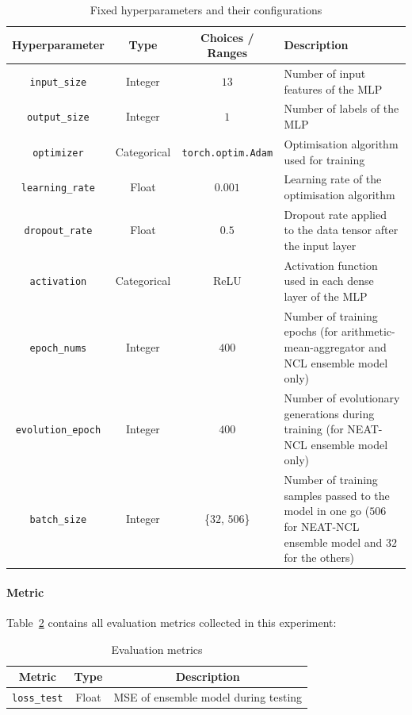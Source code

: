 \documentclass{article}
\begin{document}
\begin{table}[H]
    \centering
    \begin{tabular}{|c|c|c|p{5cm}|}
        \hline
        Hyperparameter & Type & Choices / Ranges & Description \\
        \hline
        \small\texttt{input\_size} & Integer & $13$ & Number of input features of the MLP \\
        \hline
        \small\texttt{output\_size} & Integer & $1$ & Number of labels of the MLP \\
        \hline
        \small\texttt{optimizer} & Categorical & \texttt{torch.optim.Adam} & Optimisation algorithm used for training \\
        \hline
        \small\texttt{learning\_rate} & Float & $0.001$ & Learning rate of the optimisation algorithm \\
        \hline
        \small\texttt{dropout\_rate} & Float & $0.5$ & Dropout rate applied to the data tensor after the input layer \\
        \hline
        \small\texttt{activation} & Categorical & ReLU & Activation function used in each dense layer of the MLP \\
        \hline
        \small\texttt{epoch\_nums} & Integer & $400$ & Number of training epochs (for arithmetic-mean-aggregator and NCL ensemble model only) \\
        \hline
        \small\texttt{evolution\_epoch} & Integer & $400$ & Number of evolutionary generations during training (for NEAT-NCL ensemble model only) \\
        \hline
        \small\texttt{batch\_size} & Integer & \{$32$, $506$\} & Number of training samples passed to the model in one go ($506$ for NEAT-NCL ensemble model and $32$ for the others) \\
        \hline
    \end{tabular}
    \caption{Fixed hyperparameters and their configurations}
    \label{table:experiment_5_fixed_hyperparameters}
\end{table}

\paragraph{Metric}
Table~\ref{table:experiment_5_metric} contains all evaluation metrics collected in this experiment: 

\begin{table}[H]
    \centering
    \begin{tabular}{|c|c|c|}
        \hline
        Metric & Type & Description \\
        \hline
        \small\texttt{loss\_test} & Float & MSE of ensemble model during testing \\
        \hline
    \end{tabular}
    \caption{Evaluation metrics}
    \label{table:experiment_5_metric}
\end{table}
\end{document}
